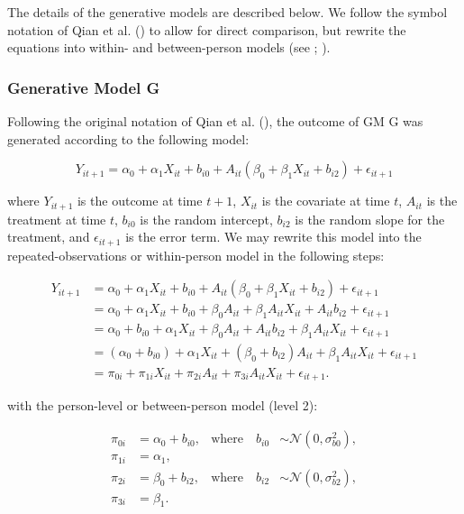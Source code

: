 \documentclass[
  11pt,
  a4paper,
]{article}
\begin{document}
The details of the generative models are described below. We follow the
symbol notation of Qian et al. () to allow
for direct comparison, but rewrite the equations into within- and
between-person models (see ; ).

\subsubsection{Generative Model G}\label{generative-model-g}

Following the original notation of Qian et al.
(), the outcome of GM G was generated
according to the following model:

\[
Y_{it+1} = \alpha_0 + \alpha_1 X_{it} + b_{i0} + A_{it} (\beta_0 + \beta_1 X_{it} + b_{i2}) + \epsilon_{it+1}
\]

where \(Y_{it+1}\) is the outcome at time \(t+1\), \(X_{it}\) is the
covariate at time \(t\), \(A_{it}\) is the treatment at time \(t\),
\(b_{i0}\) is the random intercept, \(b_{i2}\) is the random slope for
the treatment, and \(\epsilon_{it+1}\) is the error term. We may rewrite
this model into the repeated-observations or within-person model in the
following steps:

\[ 
\begin{aligned} Y_{it+1} &= \alpha_0 + \alpha_1 X_{it} + b_{i0} + A_{it} (\beta_0 + \beta_1 X_{it} + b_{i2}) + \epsilon_{it+1} \\ &= \alpha_0 + \alpha_1 X_{it} + b_{i0} + \beta_0 A_{it} +  \beta_1 A_{it} X_{it} + A_{it} b_{i2} + \epsilon_{it+1} \\ &= \alpha_0 + b_{i0} + \alpha_1 X_{it} + \beta_0 A_{it} + A_{it} b_{i2} + \beta_1 A_{it} X_{it} + \epsilon_{it+1} \\ &= (\alpha_0 + b_{i0}) + \alpha_1 X_{it} + (\beta_0 + b_{i2}) A_{it} + \beta_1 A_{it} X_{it} + \epsilon_{it+1} \\ &= \pi_{0i} + \pi_{1i} X_{it} + \pi_{2i} A_{it} + \pi_{3i} A_{it} X_{it} + \epsilon_{it+1}. \end{aligned}
\]

with the person-level or between-person model (level 2):

\[
\begin{aligned}
\pi_{0i} &= \alpha_0 + b_{i0}, & \text{where} \quad b_{i0} &\sim \mathcal{N}(0, \sigma_{b0}^2), \\
\pi_{1i} &= \alpha_1, \\
\pi_{2i} &= \beta_0 + b_{i2}, & \text{where} \quad b_{i2} &\sim \mathcal{N}(0, \sigma_{b2}^2), \\
\pi_{3i} &= \beta_1.
\end{aligned}
\]
\end{document}
